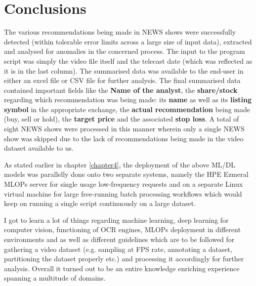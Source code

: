 \chapter{Conclusions} \label{chapter6}

The various recommendations being made in NEWS shows were successfully detected (within tolerable error limits across a large size of input data), extracted and analysed for anomalies in the concerned process.  The input to the program script was simply the video file itself and the telecast date (which was reflected as it is in the last column). The summarised data was available to the end-user in either an excel file or CSV file for further analysis. The final summarised data contained important fields like the \textbf{Name of the analyst}, the \textbf{share/stock} regarding which recommendation was being made: its \textbf{name} as well as its \textbf{listing symbol} in the appropriate exchange, the \textbf{actual recommendation} being made (buy, sell or hold), the \textbf{target price} and the associated \textbf{stop loss}.  A total of eight NEWS shows were processed in this manner wherein only a single NEWS show was skipped due to the lack of recommendations being made in the video dataset available to us. \par

As stated earlier in chapter \ref{chapter4}, the deployment of the above ML/DL models was parallelly done onto two separate systems, namely the HPE Ezmeral MLOPs server for single usage low-frequency requests and on a separate Linux virtual machine for large free-running batch processing workflows which would keep on running a single script continuously on a large dataset. \par

I got to learn a lot of things regarding machine learning, deep learning for computer vision, functioning of OCR engines, MLOPs deployment in different environments and as well as different guidelines which are to be followed for gathering a video dataset (e.g. sampling at FPS rate, annotating a dataset, partitioning the dataset properly etc.) and processing it accordingly for further analysis. Overall it turned out to be an entire knowledge enriching experience spanning a multitude of domains.
